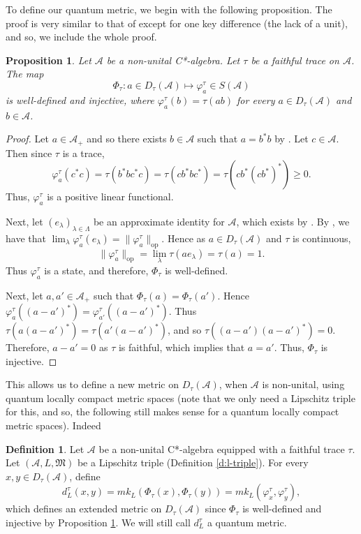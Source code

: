 \documentclass{amsart}
\theoremstyle{plain}
\newtheorem{proposition}[theorem]{Proposition}
\theoremstyle{definition}
\newtheorem{definition}[theorem]{Definition}
\theoremstyle{remark}
\numberwithin{equation}{section}
\newcommand{\A}{{\mathcal{A}}}
\newcommand{\la}{{\lambda}}
\newcommand{\La}{{\Lambda}}
\newcommand{\vhi}{{\varphi}}
\newcommand{\M}{{\mathfrak{M}}}
\renewcommand{\geq}{\geqslant}
\begin{document}
To define our quantum metric, we begin with the following proposition. The proof is very similar to that of \cite[Proposition 3.1]{Aguilar25} except for one key difference (the lack of a unit), and so, we include the whole proof.

\begin{proposition}\label{p:density-state-map}
Let $\A$ be a non-unital C*-algebra. Let $\tau$ be a faithful trace   on $\A$. 
The map 
\[
\Phi_\tau : a \in D_\tau(\A) \longmapsto \varphi_a^\tau \in S(\A)
\]
is well-defined and injective, where $\vhi^\tau_a(b)=\tau(ab)$ for every $a\in D_\tau(\A)$ and $b\in \A$. 
\end{proposition}
\begin{proof}
   Let $a\in \A_+$ and so there exists $b\in \A$ such that $a=b^*b$ by \cite[Lemma I.4.3]{Davidson}. Let $c\in \A$. Then since $\tau$ is a trace,
   \[
   \varphi_a^\tau(c^*c)= \tau(b^*bc^*c)= \tau(cb^*bc^*)= \tau(cb^*(cb^*)^*)\geq 0.
   \]
   Thus, $\varphi^\tau_a$ is a positive linear functional. 
   
   
   Next, let $(e_\la)_{\la\in \La}$ be an approximate identity for $\A$, which exists by \cite[Theorem I.4.8]{Davidson}. By \cite[Lemma I.9.5]{Davidson}, we have that $\lim_\la \varphi_a^\tau(e_\la)=\|\varphi_a^\tau\|_\mathrm{op}$.  Hence as $a \in D_\tau(\A)$ and $\tau$ is continuous,
   \[
   \|\varphi_a^\tau\|_\mathrm{op}=\lim_\la \tau(ae_\la)=\tau(a)=1.
   \]
 Thus $\varphi_a^\tau$ is a state, and therefore, $\Phi_\tau$ is well-defined.


 Next, let $a,a'\in \A_+$ such that $\Phi_\tau(a)=\Phi_\tau(a')$. Hence $\varphi_a^\tau((a-a')^*)=\varphi^\tau_{a'}((a-a')^*)$. Thus $\tau(a(a-a')^*)=\tau(a'(a-a')^*)$, and so $\tau((a-a')(a-a')^*)=0$. Therefore, $a-a'=0$ as $\tau$ is faithful, which implies that $a=a'.$  Thus,  $\Phi_\tau$ is injective.
\end{proof}
This allows us to define a new metric on $D_\tau(\A)$, when $\A$ is non-unital, using quantum locally compact metric spaces (note that we only need a Lipschitz triple for this, and so,  the following still makes sense for a quantum locally compact metric spaces). Indeed

\begin{definition}\label{d:quantum-density-metric}
   Let $\A$ be a non-unital C*-algebra equipped with a faithful trace $\tau$. Let $(\A, L, \M)$ be a Lipschitz triple (Definition \ref{d:l-triple}). For every $x,y \in D_\tau(\A)$, define
    \[
    d_L^\tau(x,y)=mk_L(\Phi_\tau(x),\Phi_\tau(y))=mk_L(\varphi^\tau_x,\varphi^\tau_y),
    \]
    which defines an extended metric on $D_\tau(\A)$ since $\Phi_\tau$    is well-defined and injective by Proposition \ref{p:density-state-map}. We will still call $d_L^\tau$ a quantum metric.
\end{definition}
\end{document}
